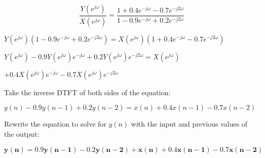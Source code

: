 \documentclass[fleqn]{article}
\begin{document}
\begin{enumerate}[nolistsep]
			\begin{equation*}
				\frac{Y(e^{j\omega})}{X(e^{j\omega})} = \frac{1 + 0.4e^{-j\omega} - 0.7e^{-j2\omega}}{1 - 0.9e^{-j\omega} + 0.2e^{-j2\omega}}
			\end{equation*}
			
			$Y(e^{j\omega})(1 - 0.9e^{-j\omega} + 0.2e^{-j2\omega}) = X(e^{j\omega})(1 + 0.4e^{-j\omega} - 0.7e^{-j2\omega})$
			
			$Y(e^{j\omega}) - 0.9Y(e^{j\omega})e^{-j\omega} + 0.2Y(e^{j\omega})e^{-j2\omega} = X(e^{j\omega})$
			
			$ + 0.4X(e^{j\omega})e^{-j\omega} - 0.7X(e^{j\omega})e^{-j2\omega}$
			
			Take the inverse DTFT of both sides of the equation:
			
			$y(n) - 0.9y(n-1) + 0.2y(n-2) = x(n) + 0.4x(n-1) - 0.7x(n-2)$
			
			Rewrite the equation to solve for $y(n)$ with the input and previous values of the output:
			
			$\mathbf{y(n) = 0.9y(n-1) - 0.2y(n-2) + x(n) + 0.4x(n-1) - 0.7x(n-2)}$
			
	\end{enumerate}
\end{document}
